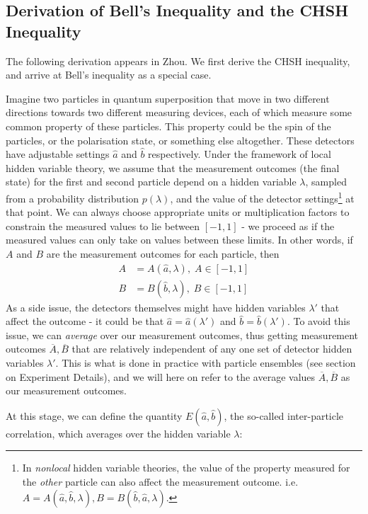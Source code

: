 \documentclass[aps,prl,nofootinbib,twocolumn,superscriptaddress,groupedaddress]{revtex4}  %
\begin{document}
\subsection{Derivation of Bell's Inequality and the CHSH Inequality}

The following derivation appears in Zhou\cite{bellderivation}. We first derive the CHSH inequality, and arrive at Bell's inequality as a special case.

Imagine two particles in quantum superposition that move in two different directions towards two different measuring devices, each of which measure some common property of these particles. This property could be the spin of the particles, or the polarisation state, or something else altogether. These detectors have adjustable settings $\hat{a}$ and $\hat{b}$ respectively. Under the framework of local hidden variable theory, we assume that the measurement outcomes (the final state) for the first and second particle depend on a hidden variable $\lambda$, sampled from a probability distribution $p(\lambda)$, and the value of the detector settings\footnote{In \textit{nonlocal} hidden variable theories, the value of the property measured for the \textit{other} particle can also affect the measurement outcome. i.e. $A = A(\hat{a},\hat{b},\lambda), B = B(\hat{b},\hat{a},\lambda)$.} at that point. We can always choose appropriate units or multiplication factors to constrain the measured values to lie between $[-1,1]$ - we proceed as if the measured values can only take on values between these limits. In other words, if $A$ and $B$ are the measurement outcomes for each particle, then
\begin{align}
A &= A(\hat{a}, \lambda),\; A \in [-1,1]\\
B &= B(\hat{b}, \lambda),\; B \in [-1,1]
\end{align}
As a side issue, the detectors themselves might have hidden variables $\lambda'$ that affect the outcome - it could be that $\hat{a} = \hat{a}(\lambda')$ and $\hat{b} = \hat{b}(\lambda')$. To avoid this issue, we can \textit{average} over our measurement outcomes, thus getting measurement outcomes $\overline{A},\overline{B}$ that are relatively independent of any one set of detector hidden variables $\lambda'$. This is what is done in practice with particle ensembles (see section on Experiment Details), and we will here on refer to the average values $\overline{A}, \overline{B}$ as our measurement outcomes.

At this stage, we can define the quantity $E(\hat{a}, \hat{b})$, the so-called inter-particle correlation, which averages over the hidden variable $\lambda$:
\end{document}
